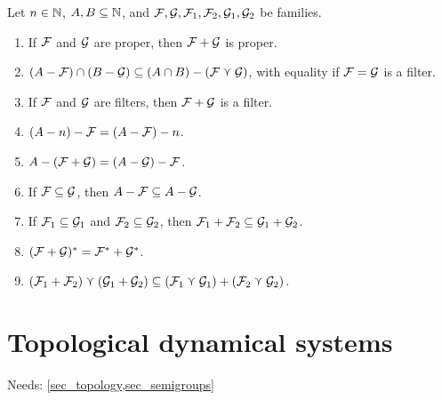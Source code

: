 Let $n \in \mathbb{N}$, $A, B \subseteq \mathbb{N}$, and $\mathcal{F}, \mathcal{G}, \mathcal{F}_1, \mathcal{F}_2, \mathcal{G}_1, \mathcal{G}_2$ be families.
\begin{enumerate}
    \item
    \label{item_family_prop_zero}
    If $\mathcal{F}$ and $\mathcal{G}$ are proper, then $\mathcal{F} + \mathcal{G}$ is proper.
    
    \item
    \label{item_family_prop_one_new}
    $(A - \mathcal{F}) \cap (B - \mathcal{G}) \subseteq (A \cap B) - (\mathcal{F} \curlyvee \mathcal{G})$, with equality if $\mathcal{F} = \mathcal{G}$ is a filter.

    \item \label{item_family_prop_two}
    If $\mathcal{F}$ and $\mathcal{G}$ are filters, then $\mathcal{F} + \mathcal{G}$ is a filter.

    \item \label{item_family_prop_three}
    $(A -n) - \mathcal{F} = (A - \mathcal{F}) - n$.

    \item \label{item_family_prop_four}
    $A - (\mathcal{F} + \mathcal{G}) = (A - \mathcal{G}) - \mathcal{F}$.

    \item \label{item_family_diff_containment}
    If $\mathcal{F} \subseteq \mathcal{G}$, then $A - \mathcal{F} \subseteq A - \mathcal{G}$.
    
    \item \label{item_filter_sums_containment}
    If $\mathcal{F}_1 \subseteq \mathcal{G}_1$ and $\mathcal{F}_2 \subseteq \mathcal{G}_2$, then $\mathcal{F}_1 + \mathcal{F}_2 \subseteq \mathcal{G}_1 + \mathcal{G}_2$.

    \item \label{item_sum_dual}
    $(\mathcal{F} + \mathcal{G})^* = \mathcal{F}^* + \mathcal{G}^*$.

    \item \label{item_cap_sums}
    $(\mathcal{F}_1 + \mathcal{F}_2) \curlyvee (\mathcal{G}_1 + \mathcal{G}_2) \subseteq (\mathcal{F}_1 \curlyvee \mathcal{G}_1) + (\mathcal{F}_2 \curlyvee \mathcal{G}_2)$.
\end{enumerate}



\section{Topological dynamical systems}
\label{sec_topological_dynamical_systems}

Needs: \cref{sec_topology,sec_semigroups}

